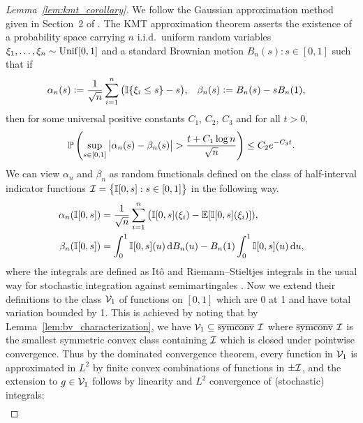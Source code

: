 \begin{proof}[Lemma~\ref{lem:kmt_corollary}]

  We follow the Gaussian approximation method given in
  Section~2 of \citet{gine2004kernel}.
  The KMT approximation theorem \citep{komlos1975approximation}
  asserts the existence
  of a probability space
  carrying $n$ i.i.d.\ uniform random variables
  $\xi_1, \ldots, \xi_n \sim \Unif[0,1]$
  and a standard Brownian motion
  $B_n(s): s \in [0,1]$
  such that if
  \begin{align*}
    \alpha_n(s)
    &\vcentcolon=
    \frac{1}{\sqrt{n}}
    \sum_{i=1}^n
    \big(
      \I\{\xi_i \leq s\} - s
    \big),
    &\beta_n(s)
    &\vcentcolon=
    B_n(s) - s B_n(1),
  \end{align*}
  then
  for some universal positive constants
  $C_1$, $C_2$, $C_3$
  and for all $t > 0$,
  \begin{align*}
    \P\left(
      \sup_{s \in [0,1]}
      \big| \alpha_n(s) - \beta_n(s) \big|
      > \frac{t + C_1\log n}{\sqrt{n}}
    \right)
    \leq C_2 e^{-C_3 t}.
  \end{align*}
  We can
  view $\alpha_n$ and $\beta_n$ as random functionals
  defined on the class of
  half-interval indicator functions
  $\cI = \big\{\I[0,s]: s \in [0,1]\big\}$
  in the following way.
  \begin{align*}
    \alpha_n(\I[0,s])
    &= \frac{1}{\sqrt{n}}
    \sum_{i=1}^n
    \big( \I[0,s](\xi_i) - \E[\I[0,s](\xi_i)]), \\
    \beta_n(\I[0,s])
    &= \int_0^1 \I[0,s](u) \diff{B_n(u)}
    - B_n(1) \int_0^1 \I[0,s](u) \diff{u},
  \end{align*}
  where the integrals are defined as It\^o and
  Riemann--Stieltjes integrals in
  the usual way for stochastic integration against semimartingales
  \citep[Chapter~5]{legall2016brownian}.
  Now we extend their definitions to the class
  $\cV_1$
  of functions on $[0,1]$
  which are 0 at 1 and have total variation bounded by 1.
  This is achieved by
  noting that by Lemma~\ref{lem:bv_characterization},
  we have
  $\cV_1 \subseteq \overline\symconv \ \cI$
  where $\overline{\symconv} \ \cI$ is the
  smallest
  symmetric convex class containing $\cI$
  which is closed under pointwise convergence.
  Thus by the dominated convergence theorem,
  every function in $\cV_1$ is approximated in $L^2$ by finite convex
  combinations of functions in $\pm\cI$,
  and the extension to $g \in \cV_1$ follows
  by linearity and $L^2$ convergence of (stochastic) integrals:
  \begin{align*}

\end{align*}
\end{proof}
